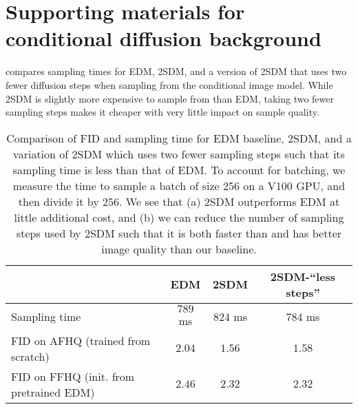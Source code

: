 \chapter{Supporting materials for conditional diffusion background} \label{supp:conditional-diffusion}

 compares sampling times for EDM, 2SDM, and a version of 2SDM that uses two fewer diffusion steps when sampling from the conditional image model. While 2SDM is slightly more expensive to sample from than EDM, taking two fewer sampling steps makes it cheaper with very little impact on sample quality.

\begin{table}[h]
    \centering
    \caption{Comparison of FID and sampling time for EDM baseline, 2SDM, and a variation of 2SDM which uses two fewer sampling steps such that its sampling time is less than that of EDM. To account for batching, we measure the time to sample a batch of size 256 on a V100 GPU, and then divide it by 256. We see that (a) 2SDM outperforms EDM at little additional cost, and (b) we can reduce the number of sampling steps used by 2SDM such that it is both faster than and has better image quality than our baseline.}
    \begin{tabular}{l|ccc}
                         & EDM & 2SDM & 2SDM-``less steps'' \\
                         \hline
    Sampling time        & $789$ ms & $824$ ms  & $784$ ms         \\
    FID on AFHQ (trained from scratch)         & $2.04$   & $1.56$ & $1.58$                   \\
    FID on FFHQ (init. from pretrained EDM)         & $2.46$   & $2.32$ & $2.32$                   \\
    \end{tabular}
    \label{tab:fid-and-time}
\end{table}